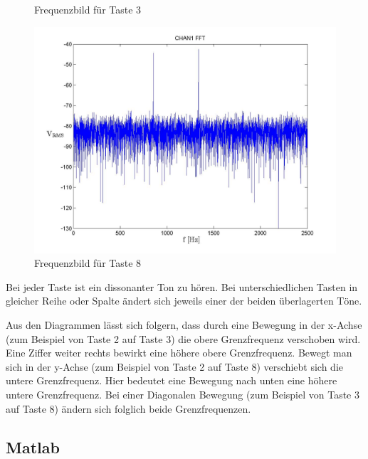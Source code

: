 \documentclass[10pt]{report}
\begin{document}
\begin{center}
\begin{figure}[H]
                \caption{Frequenzbild für Taste 3}
            \end{figure}
            \begin{figure}[H]
                \includegraphics[width=\textwidth]{Screenshot_GUI_431_T8_chan1_fft.jpg}
                \caption{Frequenzbild für Taste 8}
            \end{figure}
        \end{center}
        Bei jeder Taste ist ein dissonanter Ton zu hören. Bei unterschiedlichen Tasten
        in gleicher Reihe oder Spalte ändert sich jeweils einer der beiden überlagerten
        Töne.

        Aus den Diagrammen lässt sich folgern, dass durch eine Bewegung in der x-Achse
        (zum Beispiel von Taste 2 auf Taste 3) die obere Grenzfrequenz verschoben wird. Eine Ziffer weiter
        rechts bewirkt eine höhere obere Grenzfrequenz.
        Bewegt man sich in der y-Achse (zum Beispiel von Taste 2 auf Taste 8)
        verschiebt sich die untere Grenzfrequenz. Hier bedeutet eine Bewegung
        nach unten eine höhere untere Grenzfrequenz.
        Bei einer Diagonalen Bewegung (zum Beispiel von Taste 3 auf Taste 8) ändern
        sich folglich beide Grenzfrequenzen.

        \subsection{Matlab}
\end{document}
